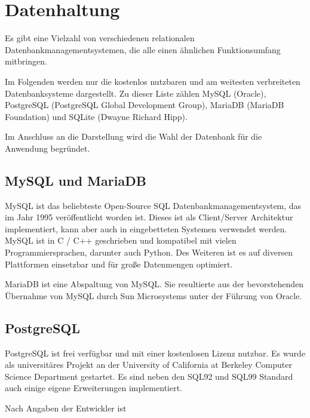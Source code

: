 \section{Datenhaltung} \label{sec:Datenhaltung}
Es gibt eine Vielzahl von verschiedenen relationalen Datenbankmanagementsystemen, die alle einen ähnlichen Funktionsumfang mitbringen.

Im Folgenden werden nur die kostenlos nutzbaren und am weitesten verbreiteten Datenbanksysteme dargestellt. Zu dieser Liste zählen MySQL (Oracle), PostgreSQL (PostgreSQL Global Development Group), MariaDB (MariaDB Foundation) und SQLite (Dwayne Richard Hipp). \cite{db-enginesDBEnginesRanking}

Im Anschluss an die Darstellung wird die Wahl der Datenbank für die Anwendung begründet.

\subsection{MySQL und MariaDB}
MySQL ist das beliebteste Open-Source SQL Datenbankmanagementsystem, das im Jahr 1995 veröffentlicht worden ist. Dieses ist als Client/Server Architektur implementiert, kann aber auch in eingebetteten Systemen verwendet werden. \cite{oraclecorporationMySQLMySQLReference2020} MySQL ist in C / C++ geschrieben und kompatibel mit vielen Programmiersprachen, darunter auch Python. Des Weiteren ist es auf diversen Plattformen einsetzbar und für große Datenmengen optimiert. \cite{oraclecorporationMySQLMySQLReference2020a}

MariaDB ist eine Abspaltung von MySQL. Sie resultierte aus der bevorstehenden Übernahme von MySQL durch Sun Microsystems unter der Führung von Oracle. \cite{ionosMariaDBVsMySQL2020}

\subsection{PostgreSQL}
PostgreSQL ist frei verfügbar und mit einer kostenlosen Lizenz nutzbar. Es wurde als universitäres Projekt an der University of California at Berkeley Computer Science Department gestartet. Es sind neben den SQL92 und SQL99 Standard auch einige eigene Erweiterungen implementiert. \cite{boenigkWasIstPostgreSQL} 

Nach Angaben der Entwickler ist  

